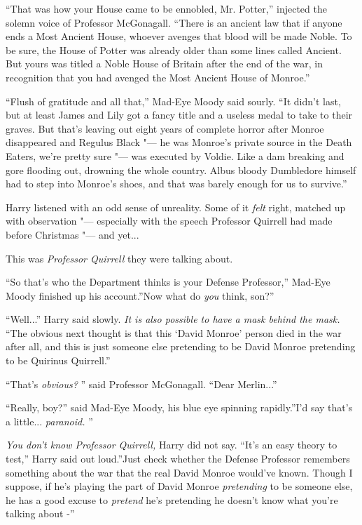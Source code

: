 ``That was how your House came to be ennobled, Mr. Potter,'' injected
the solemn voice of Professor McGonagall. ``There is an ancient law that
if anyone ends a Most Ancient House, whoever avenges that blood will be
made Noble. To be sure, the House of Potter was already older than some
lines called Ancient. But yours was titled a Noble House of Britain
after the end of the war, in recognition that you had avenged the Most
Ancient House of Monroe.''

``Flush of gratitude and all that,'' Mad-Eye Moody said sourly. ``It
didn't last, but at least James and Lily got a fancy title and a useless
medal to take to their graves. But that's leaving out eight years of
complete horror after Monroe disappeared and Regulus Black "--- he was
Monroe's private source in the Death Eaters, we're pretty sure "--- was
executed by Voldie. Like a dam breaking and gore flooding out, drowning
the whole country. Albus bloody Dumbledore himself had to step into
Monroe's shoes, and that was barely enough for us to survive.''

Harry listened with an odd sense of unreality. Some of it \emph{felt}
right, matched up with observation "--- especially with the speech
Professor Quirrell had made before Christmas "--- and yet...

This was \emph{Professor Quirrell} they were talking about.

``So that's who the Department thinks is your Defense Professor,''
Mad-Eye Moody finished up his account.''Now what do \emph{you} think,
son?''

``Well...'' Harry said slowly. \emph{It is also possible to have a
mask behind the mask.} ``The obvious next thought is that this `David
Monroe' person died in the war after all, and this is just someone else
pretending to be David Monroe pretending to be Quirinus Quirrell.''

``That's \emph{obvious?} '' said Professor McGonagall. ``Dear
Merlin...''

``Really, boy?'' said Mad-Eye Moody, his blue eye spinning rapidly.''I'd
say that's a little... \emph{paranoid.} ''

\emph{You don't know Professor Quirrell,} Harry did not say. ``It's an
easy theory to test,'' Harry said out loud.''Just check whether the
Defense Professor remembers something about the war that the real David
Monroe would've known. Though I suppose, if he's playing the part of
David Monroe \emph{pretending} to be someone else, he has a good excuse
to \emph{pretend} he's pretending he doesn't know what you're talking
about -''

